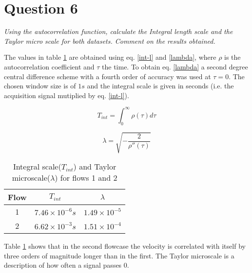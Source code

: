 \section*{Question 6}
\textit{Using the autocorrelation function, calculate the Integral length scale and the Taylor micro scale for both datasets. Comment on the results obtained.}

The values in table \ref{scales} are obtained using eq. \eqref{int-l} and \eqref{lambda}, where $\rho$ is the autocorrelation coefficient and $\tau$ the time. To obtain eq. \eqref{lambda} a second degree central difference scheme with a fourth order of accuracy was used at $\tau = 0$. The chosen window size is of $1s$ and the integral scale is given in seconds (i.e. the acquisition signal mutiplied by eq. \eqref{int-l}).

\begin{equation}\label{int-l}
T_{int} = \int_0^{\infty} \rho (\tau) d\tau
\end{equation}

\begin{equation}\label{lambda}
\lambda = \sqrt{- \frac{2}{\rho''(\tau)}}
\end{equation}

\begin{table}[!ht]
\centering
\caption{Integral scale($T_{int}$) and Taylor microscale($\lambda$) for flows 1 and 2}
\label{scales}
\begin{tabular}{c|c|c}
Flow & $T_{int}$ & $\lambda$ \\
\hline
1 & $7.46 \times 10^{-6}s$ & $1.49 \times 10^{-5}$\\
2 & $6.62 \times 10^{-3}s$ & $1.51 \times 10^{-4}$
\end{tabular}
\end{table}

Table \ref{scales} shows that in the second flowcase the velocity is correlated with itself by three orders of magnitude longer than in the first. The Taylor microscale is a description of how often a signal passes $0$.